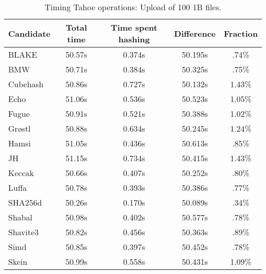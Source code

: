 \begin{table}[h]
  \centering
  \caption{Timing Tahoe operations: Upload of 100 1B files.}
  \begin{tabular}{ | l | c | c | c | c | }
    \hline
    Candidate & Total time & Time spent hashing & Difference & Fraction \\ \hline
    BLAKE     &  50.57s  &  0.374s  &  50.195s  &  .74\%   \\  \hline
    BMW       &  50.71s  &  0.384s  &  50.325s  &  .75\%   \\  \hline
    Cubehash  &  50.86s  &  0.727s  &  50.132s  &  1.43\%  \\  \hline
    Echo      &  51.06s  &  0.536s  &  50.523s  &  1.05\%  \\  \hline
    Fugue     &  50.91s  &  0.521s  &  50.388s  &  1.02\%  \\  \hline
    Grøstl    &  50.88s  &  0.634s  &  50.245s  &  1.24\%  \\  \hline
    Hamsi     &  51.05s  &  0.436s  &  50.613s  &  .85\%   \\  \hline
    JH        &  51.15s  &  0.734s  &  50.415s  &  1.43\%  \\  \hline
    Keccak    &  50.66s  &  0.407s  &  50.252s  &  .80\%   \\  \hline
    Luffa     &  50.78s  &  0.393s  &  50.386s  &  .77\%   \\  \hline
    SHA256d   &  50.26s  &  0.170s  &  50.089s  &  .34\%   \\  \hline
    Shabal    &  50.98s  &  0.402s  &  50.577s  &  .78\%   \\  \hline
    Shavite3  &  50.82s  &  0.456s  &  50.363s  &  .89\%   \\  \hline
    Simd      &  50.85s  &  0.397s  &  50.452s  &  .78\%   \\  \hline
    Skein     &  50.99s  &  0.558s  &  50.431s  &  1.09\%  \\  \hline
  \end{tabular}
  \label{tbl:hashingtimes:put1b}
\end{table}

